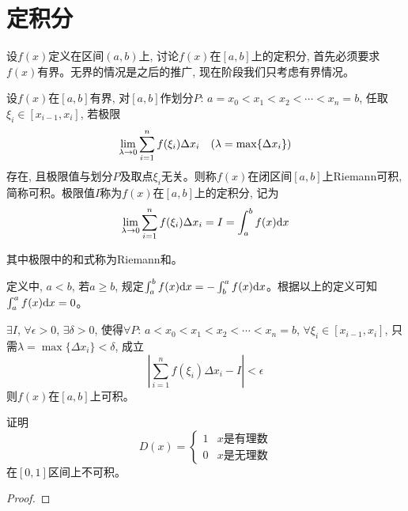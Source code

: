 \chapter{定积分}
设$f(x)$定义在区间$(a, b)$上, 讨论$f(x)$在$[a, b]$上的定积分, 首先必须要求$f(x)$有界。无界的情况是之后的推广, 现在阶段我们只考虑有界情况。
\begin{definition}[定积分的定义]
    设$f(x)$在$[a, b]$有界, 对$[a, b]$作划分$P$: $a = x_0 < x_1 < x_2 < \cdots < x_n = b $, 任取$\xi_i \in [x_{i-1}, x_i]$, 若极限
    \begin{equation*}
        \lim_{\lambda \to 0 } \sum_{i=1}^nf(\xi_i)\Delta x_i \quad (\lambda = \max\{\Delta x_i\})
    \end{equation*}
    存在, 且极限值与划分$P$及取点$\xi_i$无关。则称$f(x)$在闭区间$[a, b]$上Riemann可积, 简称可积。极限值$I$称为$f(x)$在$[a, b]$上的定积分, 记为
    \begin{equation*}
        \lim_{\lambda \to 0 } \sum_{i=1}^nf(\xi_i)\Delta x_i = I = \int_{a}^{b}f(x) \mathrm{d} x
    \end{equation*}
    
    其中极限中的和式称为Riemann和。
\end{definition}
\begin{remark}
    定义中, $a < b$, 若$a \ge b$, 规定$\int_{a}^{b}f(x)\mathrm{d} x = -\int_{b}^{a}f(x)\mathrm{d} x$。根据以上的定义可知$\int_a^af(x)\mathrm{d} x = 0$。
\end{remark}

\begin{definition}
    $\exists I$, $\forall \epsilon > 0$, $\exists \delta > 0$, 使得$\forall P$: $a < x_0 < x_1 < x_2 < \cdots < x_n = b$, $\forall \xi_i \in [x_{i-1}, x_i]$, 只需$\lambda = \max\{\Delta x_i\} < \delta$, 成立
    \begin{equation*}
        \left| \sum_{i=1}^{n}f(\xi_i)\Delta x_i - I \right| < \epsilon
    \end{equation*}
    则$f(x)$在$[a, b]$上可积。
\end{definition}

\begin{example}[Dirichlet函数]
    证明
    \begin{equation*}
        D(x) = 
        \begin{cases}
            1 & x\text{是有理数} \\
            0 & x\text{是无理数}
        \end{cases}
    \end{equation*}
    在$[0, 1]$区间上不可积。
\end{example}
\begin{proof}
    
\end{proof}


